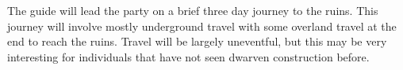 The guide will lead the party on a brief three day journey to the ruins.
This journey will involve mostly underground travel with some overland travel at the end to reach the ruins.
Travel will be largely uneventful, but this may be very interesting for individuals that have not seen dwarven construction before.
